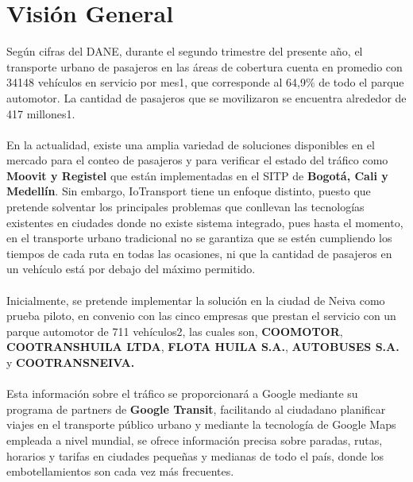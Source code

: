 \documentclass[letterpaper]{twentysecondcv} %
\begin{document}
\section{Visión General}
\begin{twenty}
	\twentyitem
    	{}
		{}
        {}
        {}
        {}
        {
   	    Según cifras del DANE, durante el segundo trimestre del presente año, el transporte urbano de pasajeros en las áreas de cobertura cuenta en promedio con 34148 vehículos en servicio por mes1, que corresponde al 64,9\% de todo el parque automotor. La cantidad de pasajeros que se movilizaron se encuentra alrededor de 417 millones1.\\ \\
   	    {En la actualidad, existe una amplia variedad de soluciones disponibles en el mercado para el conteo de pasajeros y para verificar el estado del tráfico como \textbf{Moovit y Registel} que están implementadas en el SITP de \textbf{Bogotá, Cali y Medellín}. Sin embargo, IoTransport tiene un enfoque distinto, puesto que pretende solventar los principales problemas que conllevan las tecnologías existentes en ciudades donde no existe sistema integrado, pues hasta el momento, en el transporte urbano tradicional no se garantiza que se estén cumpliendo los tiempos de cada ruta en todas las ocasiones, ni que la cantidad de pasajeros en un vehículo está por debajo del máximo permitido.} \\ \\
        {Inicialmente, se pretende implementar la solución en la ciudad de Neiva como prueba piloto, en convenio con las cinco empresas que prestan el servicio con un parque automotor de 711 vehículos2, las cuales son, \textbf{COOMOTOR}, \textbf{COOTRANSHUILA LTDA}, \textbf{FLOTA HUILA S.A.}, \textbf{AUTOBUSES S.A.} y \textbf{COOTRANSNEIVA.} \\ \\
        {Esta información sobre el tráfico se proporcionará a Google mediante su programa de partners de \textbf{Google Transit}, facilitando al ciudadano planificar viajes en el transporte público urbano y mediante la tecnología de Google Maps empleada a nivel mundial, se ofrece información precisa sobre paradas, rutas, horarios y tarifas en ciudades pequeñas y medianas de todo el país, donde los embotellamientos son cada vez más frecuentes.} \\
        }
        }
\end{twenty}

\newpage
\makeprofile
\end{document}
